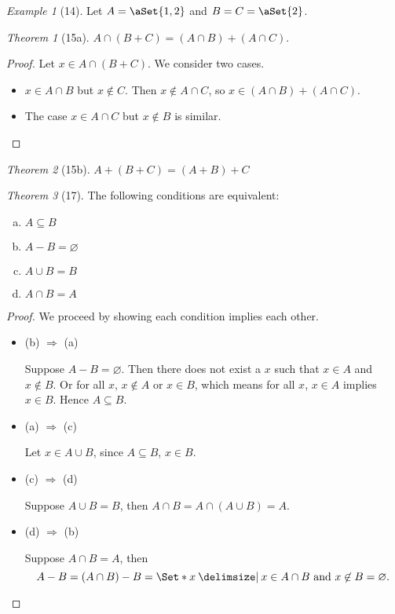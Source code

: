 \documentclass[12pt]{article}
\theoremstyle{plain}
\theoremstyle{remark}
\newtheorem*{exthm}{Theorem}
\newtheorem*{eg}{Example}
\theoremstyle{definition}
\theoremstyle{remark}
\providecommand\st{}
\newcommand\SetSymbol[1][]{%
 \nonscript\:#1\vert%
 \allowbreak%
 \nonscript\:
\mathopen{}}
\renewcommand\st{\SetSymbol[\delimsize]}
\DeclarePairedDelimiter\aSet\{\}
\begin{document}
\begin{eg}[14]
 Let $A = \aSet{1,2}$ and $B = C = \aSet{2}$.
\end{eg}

\begin{exthm}[15a]
 $A \cap (B + C) = (A \cap B) + (A \cap C)$.
\end{exthm}
\begin{proof}
 Let $x \in A \cap (B + C)$. We consider two cases.
 \begin{itemize}
  \item $x \in A \cap B$ but $x \not\in C$. Then $x \not\in A \cap C$, so $x \in (A \cap B) + (A \cap C)$.
  \item The case $x \in A \cap C$ but $x \not\in B$ is similar.
 \end{itemize}
\end{proof}
\begin{exthm}[15b]
 $A + (B + C) = (A + B) + C$
\end{exthm}

\begin{exthm}[17]
 The following conditions are equivalent:
 \begin{multicols}{2}
  \begin{enumerate}[(a)]
   \item $A \subseteq B$
   \item $A - B = \varnothing$
   \item $A \cup B = B$
   \item $A \cap B = A$
  \end{enumerate}
 \end{multicols}
\end{exthm}
\begin{proof}
 We proceed by showing each condition implies each other.
 \begin{itemize}
  \item (b) $\Rightarrow$ (a)

   Suppose $A - B = \varnothing$. Then there does not exist a $x$ such that $x \in A$ and $x \not\in B$. Or for all $x$, $x \not\in A$ or $x \in B$, which means for all $x$, $x \in A$ implies $x \in B$. Hence $A \subseteq B$.
  \item (a) $\Rightarrow$ (c)

   Let $x \in A \cup B$, since $A \subseteq B$, $x \in B$.

  \item (c) $\Rightarrow$ (d)

   Suppose $A \cup B = B$, then $A \cap B = A \cap (A \cup B) = A$.

  \item (d) $\Rightarrow$ (b)

   Suppose $A \cap B = A$, then
   \[
   A - B = (A \cap B) - B = \Set*{x \st x \in A \cap B\ \text{and}\ x \not\in B} = \varnothing.
  \]

 \end{itemize}
\end{proof}
\end{document}
